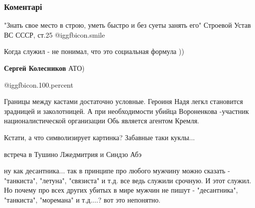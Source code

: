  
 
 
 
 
\subsubsection{Коментарі}
\label{sec:27_05_2018.fb.lesev_igor.1.ieharhia_grazhdan_ukraina.cmt}

\begin{itemize} %

"Знать свое место в строю, уметь быстро и без суеты занять его"
Строевой Устав ВС СССР, ст.25
 @igg{fbicon.smile} 

\begin{itemize} %
Когда служил - не понимал, что это социальная формула ))

\textbf{Сергей Колесников} АТО)
\end{itemize} %

 @igg{fbicon.100.percent} 


Границы между кастами достаточно условные. Героиня Надя легкл становится
зрадницей и заколотницей. А при необходимости убийца Вороненкова -участник
националистической организации Обь является агентом Кремля.

Кстати, а что символизирует картинка? Забавные таки куклы...

\begin{itemize} %
встреча в Тушино Лжедмитрия и Синдзо Абэ
\end{itemize} %


ну как десантника... так в принципе про любого мужчину можно сказать -
"танкиста", "летуна", "связиста" и т.д. все ведь служили срочную. И этот
служил. Но почему про всех других убитых в мире мужчин не пишут - "десантника",
"танкиста", "моремана" и т.д....? вот это непонятно.

\end{itemize} %

